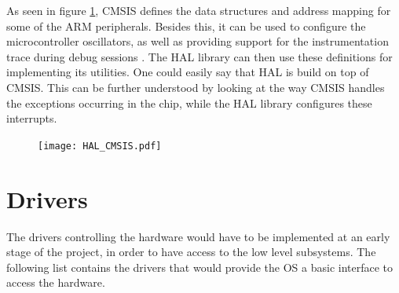 As seen in figure \ref{fig:CMSIS_HAL}, CMSIS
defines the data structures and address mapping for some of the ARM peripherals.
Besides this, it can be used to configure the microcontroller
oscillators, as well as providing support for the instrumentation trace during debug sessions \cite{cmsis_reference}.
The HAL library can then use these definitions for implementing its utilities.
One could easily say that HAL is build on top of CMSIS.
This can be further understood by looking at the way CMSIS handles
the exceptions occurring in the chip, while the HAL library configures
these interrupts.

\begin{figure}[H]
\centering
\texttt{[image: HAL\_CMSIS.pdf]}
\label{fig:CMSIS_HAL}
\end{figure}


\section{Drivers}
The drivers controlling the hardware would have to be implemented at an
early stage of the project, in order to have access to the low level
subsystems.
The following list contains the drivers that would provide the OS a basic
interface to access the hardware.

